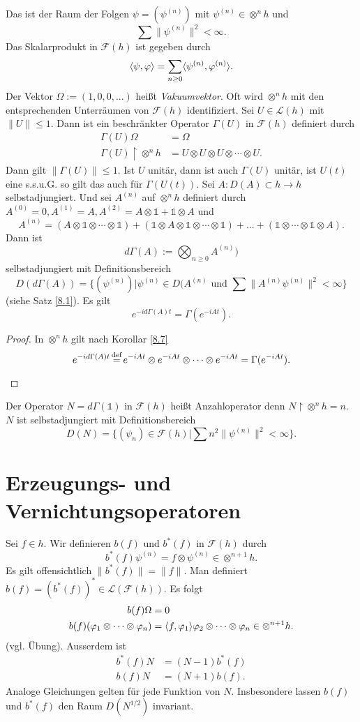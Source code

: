 \documentclass{mycourse}
\begin{document}
Das ist der Raum der Folgen $\psi=(\psi^{(n)})$ mit $\psi^{(n)} \in \otimes^n h$ und 
\[
\sum \| \psi^{(n)} \|^2 < \infty.
\]
Das Skalarprodukt in $\mathcal F(h)$ ist gegeben durch
\[
\langle \psi, \varphi \rangle = \sum_{n\ge 0} \langle \psi^{(n)}, \varphi^{(n)}\rangle.
\]
Der Vektor $\Omega :=(1,0,0,...)$ heißt \emph{Vakuumvektor}. Oft wird $\otimes^n h$ mit den entsprechenden Unterräumen von $\mathcal F(h)$ identifiziert. Sei $U\in \mathcal L(h)$ mit $\| U \| \le 1$. Dann ist ein beschränkter Operator $\Gamma(U)$ in $\mathcal F(h)$ definiert durch
\begin{align*}
\Gamma(U) \Omega &= \Omega\\
\Gamma(U) \upharpoonright \otimes^n h &= U \otimes U \otimes U \otimes \cdots \otimes U.
\end{align*}
Dann gilt $\| \Gamma(U)\| \le 1$. Ist $U$ unitär, dann ist auch $\Gamma(U)$ unitär, ist $U(t)$ eine s.s.u.G. so gilt das auch für $\Gamma(U(t))$. Sei $A: D(A) \subset h \to h$ selbstadjungiert. Und sei $A^{(n)}$ auf $\otimes^n h$ definiert durch $A^{(0)} = 0, A^{(1)}=A, A^{(2)} = A \otimes \mathbb 1 + \mathbb 1 \otimes A$ und
\[
A^{(n)} = (A \otimes \mathbb 1 \otimes \cdots \otimes \mathbb 1) + (\mathbb 1 \otimes A \otimes \mathbb 1 \otimes \cdots \otimes \mathbb 1) + ... + (\mathbb 1 \otimes \cdots \otimes \mathbb 1\otimes A).
\]
Dann ist
\[
d \Gamma(A) := \bigotimes_{n\ge 0} A^{(n)})
\]
selbstadjungiert mit Definitionsbereich
\[
D(d\Gamma(A)) = \{ (\psi^{(n)})| \psi^{(n)} \in D(A^{(n)} \text{ und } \sum \|A^{(n)} \psi^{(n)} \|^2 < \infty \}
\]
(siehe Satz \ref{8.1}). Es gilt
\[
e^{-i d\Gamma(A)t}= \Gamma(e^{-iAt}).
\]
\begin{proof}
In $\otimes^n h$ gilt nach Korollar \ref{8.7}
\[
e^{-id\Gamma(A)t} \stack{\text{def}}= e^{-iAt} \otimes e^{-iAt} \otimes\cdots \otimes e^{-iAt} =\Gamma(e^{-iAt}).
\]
\end{proof}
\begin{ex*}
Der Operator $N= d\Gamma(\mathbb 1)$ in $\mathcal F(h)$ heißt Anzahloperator denn $N \upharpoonright \otimes^n h = n$. $N$ ist selbstadjungiert mit Definitionsbereich
\[
D(N) = \{ ( \psi_n) \in \mathcal F(h) | \sum n^2 \|\psi^{(n)}\|^2 <\infty\}.
\]
\end{ex*}
\section{Erzeugungs- und Vernichtungsoperatoren}
Sei $f\in h$. Wir definieren $b(f)$ und $b^*(f)$ in $\mathcal F(h)$ durch
\[
b^*(f) \psi^{(n)} = f \otimes \psi^{(n)}\in \otimes^{n+1} h.
\]
Es gilt offensichtlich $\| b^*(f)\| = \| f\|$. Man definiert $b(f) = (b^*(f))^* \in \mathcal L(\mathcal F(h))$. Es folgt
\begin{align*}
b(f) \Omega &=0\\
b(f) (\varphi_1 \otimes \cdots \otimes \varphi_n) &= \langle f, \varphi_1 \rangle \varphi_2 \otimes \cdots \otimes \varphi_n\in \otimes^{n+1} h.
\end{align*}
(vgl. Übung). Ausserdem ist
\begin{align*}
b^*(f) N &= (N-1) b^*(f)\\
b(f) N &= (N+1) b(f).
\end{align*}
\fixme Analoge Gleichungen gelten für jede Funktion von $N$. Insbesondere lassen $b(f)$ und $b^*(f)$ den Raum $D(N^{1/2})$ invariant.
\end{document}
